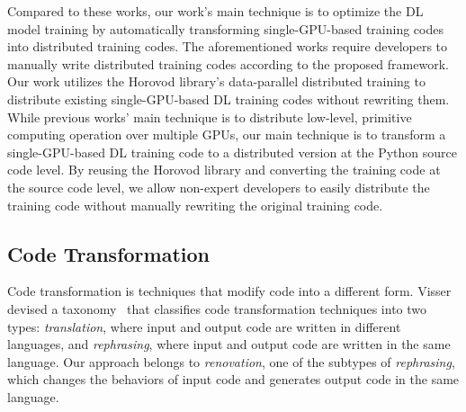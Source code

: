 \begin{inred}
Compared to these works, 
our work's main technique is to optimize the DL model training by
automatically transforming single-GPU-based training codes into distributed training codes.
The aforementioned works require developers to manually write distributed training codes
according to the proposed framework.
Our work utilizes the Horovod library’s data-parallel distributed training to 
distribute existing single-GPU-based DL training codes without rewriting them.
While previous works’ main technique is to distribute low-level, 
primitive computing operation over multiple GPUs, 
our main technique is to transform a single-GPU-based DL training code 
to a distributed version at the Python source code level. 
By reusing the Horovod library and converting the training code at the source code level, 
we allow non-expert developers to easily distribute the training code without manually rewriting the original training code.



\end{inred}

\subsection{Code Transformation}

Code transformation is techniques that modify code into a different form.  
Visser devised a taxonomy~\cite{visser2001survey} that classifies code transformation
techniques into two types: 
\textit{translation}, where input and output code are written in different
languages, and \textit{rephrasing}, where input and output code are written in
the same language.
Our approach belongs to \textit{renovation}, one of the subtypes of
\textit{rephrasing}, which changes the behaviors of input code and generates
output code in the same language.


